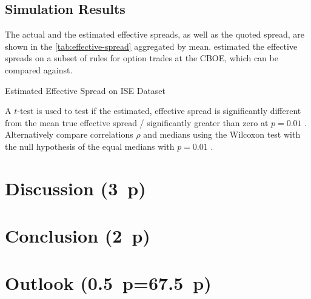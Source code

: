 \subsection{Simulation Results}\label{sec:simulation-results}

The actual and the estimated effective spreads, as well as the quoted spread, are shown in the \cref{tab:effective-spread} aggregated by mean. \textcite[][896--897]{savickasInferringDirectionOption2003} estimated the effective spreads on a subset of rules for option trades at the \gls{CBOE}, which can be compared against.

\begin{table}[H]
    \centering
    
    \caption{Estimated Effective Spread on \gls{ISE} Dataset}
    \label{tab:effective-spread}
\end{table}

A $t$-test is used to test if the estimated, effective spread is significantly different from the mean true effective spread / significantly greater than zero at $p=0.01$ \autocite[cp.][570]{finucaneDirectTestMethods2000}. Alternatively compare correlations $\rho$ and medians using the Wilcoxon test with the null hypothesis of the equal medians with $p=0.01$ \autocite[cp.][12]{theissenTestAccuracyLee2000}.

\newpage
\section{Discussion (3~p)}\label{sec:discussion}

\newpage
\section{Conclusion (2~p)}\label{sec:conclusion}

\newpage
\section{Outlook (0.5~p=67.5~p)}\label{sec:outlook}

